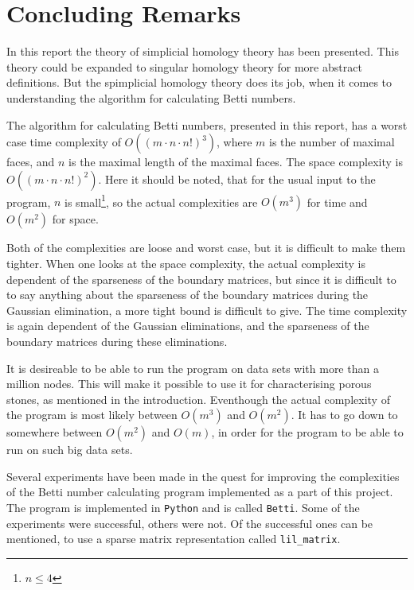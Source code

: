 \documentclass[11pt,a4paper,twoside]{report}
\begin{document}
\chapter{Concluding Remarks}
In this report the theory of simplicial homology theory has been presented. This theory could be expanded to singular homology theory for more abstract definitions. But the spimplicial homology theory does its job, when it comes to understanding the algorithm for calculating Betti numbers.

The algorithm for calculating Betti numbers, presented in this report, has a worst case time complexity of $O((m\cdot n\cdot n!)^3)$, where $m$ is the number of maximal faces, and $n$ is the maximal length of the maximal faces. The space complexity is $O((m\cdot n\cdot n!)^2)$. Here it should be noted, that for the usual input to the program, $n$ is small\footnote{$n\leq 4$}, so the actual complexities are $O(m^3)$ for time and $O(m^2)$ for space. 

Both of the complexities are loose and worst case, but it is difficult to make them tighter. When one looks at the space complexity, the actual complexity is dependent of the sparseness of the boundary matrices, but since it is difficult to to say anything about the sparseness of the boundary matrices during the Gaussian elimination, a more tight bound is difficult to give. The time complexity is again dependent of the Gaussian eliminations, and the sparseness of the boundary matrices during these eliminations. 

It is desireable to be able to run the program on data sets with more than a million nodes. This will make it possible to use it for characterising porous stones, as mentioned in the introduction. Eventhough the actual complexity of the program is most likely between $O(m^3)$ and $O(m^2)$. It has to go down to somewhere between $O(m^2)$ and $O(m)$, in order for the program to be able to run on such big data sets.

Several experiments have been made in the quest for improving the complexities of the Betti number calculating program implemented as a part of this project. The program is implemented in \texttt{Python} and is called \texttt{Betti}. Some of the experiments were successful, others were not. Of the successful ones can be mentioned, to use a sparse matrix representation called \texttt{lil\_matrix}. 
\end{document}
